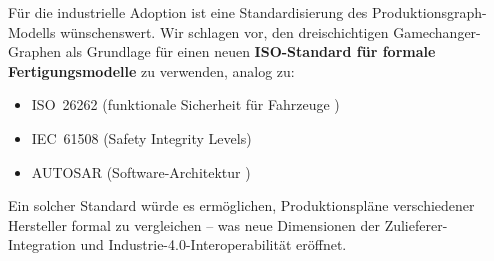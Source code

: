 ﻿\documentclass[a4paper,12pt]{article}
\theoremstyle{definition}
\begin{document}
Für die industrielle Adoption ist eine Standardisierung des Produktionsgraph-Modells
wünschenswert. Wir schlagen vor, den dreischichtigen Gamechanger-Graphen als Grundlage
für einen neuen \textbf{ISO-Standard für formale Fertigungsmodelle} zu verwenden, analog zu:
\begin{itemize}
\item ISO~26262 (funktionale Sicherheit für Fahrzeuge \cite{iso26262})
\item IEC~61508 (Safety Integrity Levels)
\item AUTOSAR (Software-Architektur \cite{autosar2023})
\end{itemize}
Ein solcher Standard würde es ermöglichen, Produktionspläne verschiedener Hersteller
formal zu vergleichen -- was neue Dimensionen der Zulieferer-Integration und
Industrie-4.0-Interoperabilität eröffnet.

\end{document}
